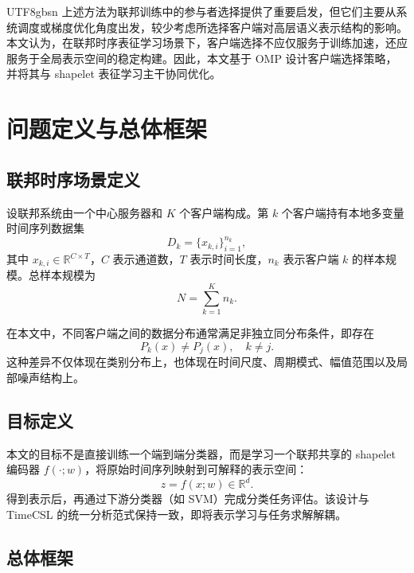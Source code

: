 \documentclass{article}
\begin{document}
\begin{CJK*}{UTF8}{gbsn}
上述方法为联邦训练中的参与者选择提供了重要启发，但它们主要从系统调度或梯度优化角度出发，较少考虑所选择客户端对高层语义表示结构的影响。本文认为，在联邦时序表征学习场景下，客户端选择不应仅服务于训练加速，还应服务于全局表示空间的稳定构建。因此，本文基于 OMP 设计客户端选择策略，并将其与 shapelet 表征学习主干协同优化。

\section{问题定义与总体框架}

\subsection{联邦时序场景定义}

设联邦系统由一个中心服务器和 $K$ 个客户端构成。第 $k$ 个客户端持有本地多变量时间序列数据集
\begin{equation}
D_k = \{x_{k,i}\}_{i=1}^{n_k},
\end{equation}
其中 $x_{k,i}\in \mathbb{R}^{C\times T}$，$C$ 表示通道数，$T$ 表示时间长度，$n_k$ 表示客户端 $k$ 的样本规模。总样本规模为
\begin{equation}
N = \sum_{k=1}^{K} n_k.
\end{equation}

在本文中，不同客户端之间的数据分布通常满足非独立同分布条件，即存在
\begin{equation}
P_k(x)\neq P_j(x),\quad k\neq j.
\end{equation}
这种差异不仅体现在类别分布上，也体现在时间尺度、周期模式、幅值范围以及局部噪声结构上。

\subsection{目标定义}

本文的目标不是直接训练一个端到端分类器，而是学习一个联邦共享的 shapelet 编码器 $f(\cdot;w)$，将原始时间序列映射到可解释的表示空间：
\begin{equation}
z = f(x;w)\in \mathbb{R}^{d}.
\end{equation}
得到表示后，再通过下游分类器（如 SVM）完成分类任务评估。该设计与 TimeCSL 的统一分析范式保持一致，即将表示学习与任务求解解耦。

\subsection{总体框架}


\end{CJK*}
\end{document}
